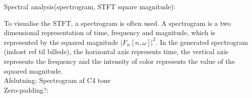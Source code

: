 Spectral analysis(spectrogram, STFT square magnitude):


To visualise the STFT, a spectrogram is often used. A spectrogram
is a two dimensional representation of time, frequency and magnitude, which is represented by the squared magnitude $ |F_w[n,\omega]|^2$.
In the generated spectrogram (indsæt ref til billede), the horizontal axis represents time, the vertical axis represents the frequency and the intensity of color represents the value of the squared magnitude. 
\\
Afslutning: Spectrogram af C4 tone
\\
Zero-padding?:


